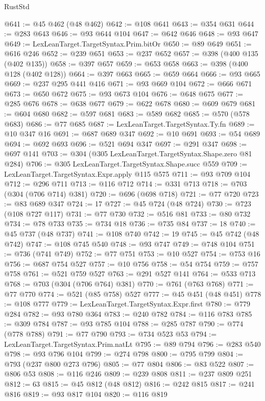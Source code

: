 \begin{lexlean}{RustStd}
\begin{coremodule}
@641 := @45 @462 (@48 @462)
@642 := @108 @641
@643 := @354 @631
@644 := @283 @643
@646 := @93 @644 @104
@647 := @642 @646
@648 := @93 @647
@649 := LexLeanTarget.TargetSyntax.Prim.bitOr
@650 := @89 @649
@651 := @616 @246
@652 := @239 @651
@653 := @237 @652
@657 := @398 (@400 @135 (@402 @135))
@658 := @397 @657
@659 := @653 @658
@663 := @398 (@400 @128 (@402 @128))
@664 := @397 @663
@665 := @659 @664
@666 := @93 @665
@669 := @237 @295 @441 @416
@671 := @93 @669 @104
@672 := @666 @671
@673 := @650 @672
@675 := @93 @673 @104
@676 := @648 @675
@677 := @285 @676
@678 := @638 @677
@679 := @622 @678
@680 := @609 @679
@681 := @604 @680
@682 := @597 @681
@683 := @589 @682
@685 := @570 (@578 @683)
@686 := @77 @685
@687 := LexLeanTarget.TargetSyntax.Ty.fn
@689 := @10 @347 @16
@691 := @687 @689 @347
@692 := @10 @691
@693 := @54 @689
@694 := @692 @693
@696 := @521 @694 @347
@697 := @291 @347
@698 := @697 @141
@703 := @304 (@305 LexLeanTarget.TargetSyntax.Shape.zero @81 @284)
@706 := @305 LexLeanTarget.TargetSyntax.Shape.succ @559
@709 := LexLeanTarget.TargetSyntax.Expr.apply @115 @575
@711 := @93 @709 @104
@712 := @296 @711
@713 := @116 @712
@714 := @331 @713
@718 := @703 (@304 (@706 @714) @381)
@720 := @696 (@698 @718)
@721 := @77 @720
@723 := @83 @689 @347
@724 := 17
@727 := @45 @724 (@48 @724)
@730 := @723 (@108 @727 @117)
@731 := @77 @730
@732 := @516 @81
@733 := @80 @732
@734 := @78 @733
@735 := @734 @18
@736 := @735 @84
@737 := 18
@740 := @45 @737 (@48 @737)
@741 := @108 @740
@742 := 19
@745 := @45 @742 (@48 @742)
@747 := @108 @745 @540
@748 := @93 @747
@749 := @748 @104
@751 := @736 (@741 @749)
@752 := @77 @751
@753 := @10 @527
@754 := @753 @16
@756 := @687 @754 @527
@757 := @10 @756
@758 := @54 @754
@759 := @757 @758
@761 := @521 @759 @527
@763 := @291 @527 @141
@764 := @533 @713
@768 := @703 (@304 (@706 @764) @381)
@770 := @761 (@763 @768)
@771 := @77 @770
@774 := @521 (@85 @758) @527
@777 := @45 @451 (@48 @451)
@778 := @108 @777
@779 := LexLeanTarget.TargetSyntax.Expr.first
@780 := @779 @284
@782 := @93 @780 @364
@783 := @240 @782
@784 := @116 @783
@785 := @309 @784
@787 := @93 @785 @104
@788 := @285 @787
@790 := @774 (@778 @788)
@791 := @77 @790
@793 := @734 @523 @53
@794 := LexLeanTarget.TargetSyntax.Prim.natLt
@795 := @89 @794
@796 := @283 @540
@798 := @93 @796 @104
@799 := @274 @798
@800 := @795 @799
@804 := @793 (@237 @800 @273 @796)
@805 := @77 @804
@806 := @83 @522
@807 := @806 @53
@808 := @116 @246
@809 := @239 @808
@811 := @237 @809 @251
@812 := 63
@815 := @45 @812 (@48 @812)
@816 := @242 @815
@817 := @241 @816
@819 := @93 @817 @104
@820 := @116 @819

\end{coremodule}
\end{lexlean}
